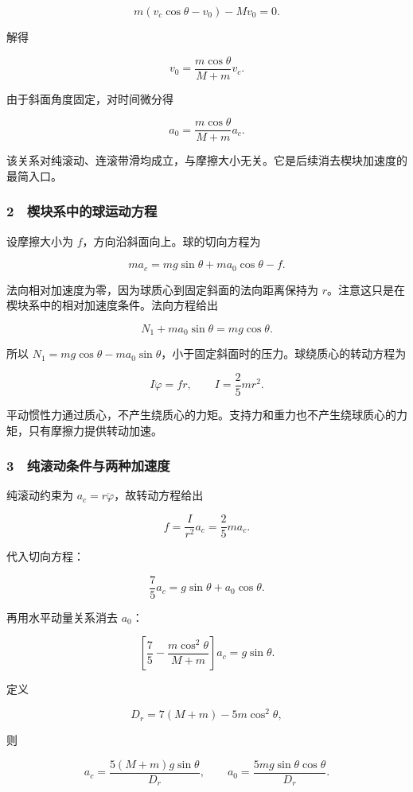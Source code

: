 \documentclass[12pt,a4paper,fontset=fandol]{ctexart}
\begin{document}
\[m(v_c\cos\theta-v_0)-Mv_0=0.\]

解得

\[\boxed{v_0=\frac{m\cos\theta}{M+m}v_c.}\]

由于斜面角度固定，对时间微分得

\[\boxed{a_0=\frac{m\cos\theta}{M+m}a_c.}\]

该关系对纯滚动、连滚带滑均成立，与摩擦大小无关。它是后续消去楔块加速度的最简入口。

\subsubsection{2　楔块系中的球运动方程}\label{ux6954ux5757ux7cfbux4e2dux7684ux7403ux8fd0ux52a8ux65b9ux7a0b}

设摩擦大小为 \(f\)，方向沿斜面向上。球的切向方程为

\[\boxed{ma_c=mg\sin\theta+ma_0\cos\theta-f.}\]

法向相对加速度为零，因为球质心到固定斜面的法向距离保持为
\(r\)。注意这只是在楔块系中的相对加速度条件。法向方程给出

\[\boxed{N_1+ma_0\sin\theta=mg\cos\theta.}\]

所以
\(N_1=mg\cos\theta-ma_0\sin\theta\)，小于固定斜面时的压力。球绕质心的转动方程为

\[I\ddot\varphi=fr,\qquad I=\frac25mr^2.\]

平动惯性力通过质心，不产生绕质心的力矩。支持力和重力也不产生绕球质心的力矩，只有摩擦力提供转动加速。

\subsubsection{3　纯滚动条件与两种加速度}\label{ux7eafux6edaux52a8ux6761ux4ef6ux4e0eux4e24ux79cdux52a0ux901fux5ea6}

纯滚动约束为 \(a_c=r\ddot\varphi\)，故转动方程给出

\[f=\frac I{r^2}a_c=\frac25ma_c.\]

代入切向方程：

\[\frac75a_c=g\sin\theta+a_0\cos\theta.\]

再用水平动量关系消去 \(a_0\)：

\[\left[\frac75-\frac{m\cos^2\theta}{M+m}\right]a_c=g\sin\theta.\]

定义

\[D_r=7(M+m)-5m\cos^2\theta,\]

则

\[\boxed{a_c=\frac{5(M+m)g\sin\theta}{D_r},\qquad
a_0=\frac{5mg\sin\theta\cos\theta}{D_r}.}\]
\end{document}
